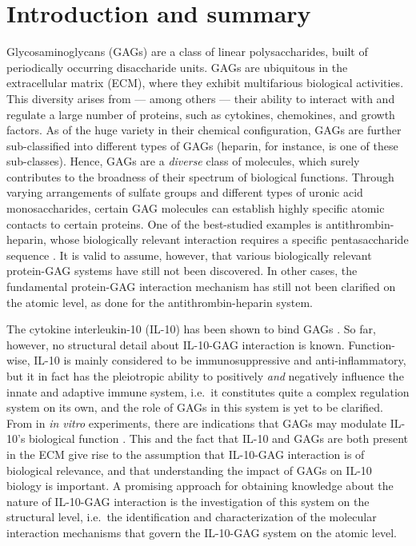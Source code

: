 \chapter{Introduction and summary}



Glycosaminoglycans (GAGs) are a class of linear polysaccharides, built of
periodically occurring disaccharide units. GAGs are ubiquitous in the
extracellular matrix (ECM), where they exhibit multifarious biological
activities. This diversity arises from --- among others --- their ability to
interact with and regulate a large number of proteins, such as cytokines,
chemokines, and growth factors. As of the huge variety in their chemical
configuration, GAGs are further sub-classified into different types of GAGs
(heparin, for instance, is one of these sub-classes). Hence, GAGs are a
\textit{diverse} class of molecules, which surely contributes to the broadness
of their spectrum of biological functions. Through varying arrangements of
sulfate groups and different types of uronic acid monosaccharides, certain GAG
molecules can establish highly specific atomic contacts to certain proteins. One
of the best-studied examples is antithrombin-heparin, whose biologically
relevant interaction requires a specific pentasaccharide sequence
\cite{antithrombin-thrombin-heparin-2004}. It is valid to assume, however, that
various biologically relevant protein-GAG systems have still not been
discovered. In other cases, the fundamental protein-GAG interaction mechanism
has still not been clarified on the atomic level, as done for the
antithrombin-heparin system.

The cytokine interleukin-10 (IL-10) has been shown to bind GAGs
\cite{salek_ardakani_2000}. So far, however, no structural detail about
IL-10-GAG interaction is known. Function-wise, IL-10 is mainly considered to be
immunosuppressive and anti-inflammatory, but it in fact has the pleiotropic
ability to positively \textit{and} negatively influence the innate and adaptive
immune system, i.e.\ it constitutes quite a complex regulation system on its
own, and the role of GAGs in this system is yet to be clarified. From in
\textit{in vitro} experiments, there are indications that GAGs may modulate
IL-10's biological function \cite{salek_ardakani_2000}. This and the fact that
IL-10 and GAGs are both present in the ECM give rise to the assumption that
IL-10-GAG interaction is of biological relevance, and that understanding the
impact of GAGs on IL-10 biology is important. A promising approach for obtaining
knowledge about the nature of IL-10-GAG interaction is the investigation of this
system on the structural level, i.e.\ the identification and characterization of
the molecular interaction mechanisms that govern the IL-10-GAG system on the
atomic level.

